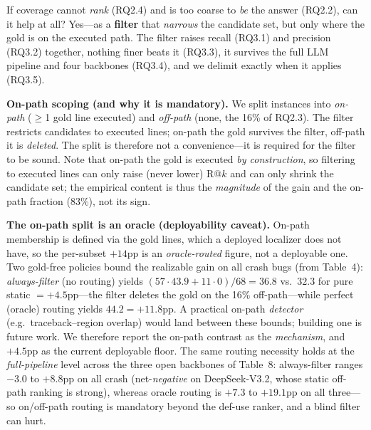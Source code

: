\documentclass[11pt]{article}
\begin{document}
If coverage cannot \emph{rank} (RQ2.4) and is too coarse to \emph{be} the answer (RQ2.2), can it help at all? Yes---as a \textbf{filter} that \emph{narrows} the candidate set, but only where the gold is on the executed path. The filter raises recall (RQ3.1) and precision (RQ3.2) together, nothing finer beats it (RQ3.3), it survives the full LLM pipeline and four backbones (RQ3.4), and we delimit exactly when it applies (RQ3.5).

\smallskip\noindent\textbf{On-path scoping (and why it is mandatory).} We split instances into \emph{on-path} ($\ge$1 gold line executed) and \emph{off-path} (none, the 16\% of RQ2.3). The filter restricts candidates to executed lines; on-path the gold survives the filter, off-path it is \emph{deleted}. The split is therefore not a convenience---it is required for the filter to be sound. Note that on-path the gold is executed \emph{by construction}, so filtering to executed lines can only raise (never lower) R@$k$ and can only shrink the candidate set; the empirical content is thus the \emph{magnitude} of the gain and the on-path fraction (83\%), not its sign.

\smallskip\noindent\textbf{The on-path split is an oracle (deployability caveat).} On-path membership is defined via the gold lines, which a deployed localizer does not have, so the per-subset $+14$pp is an \emph{oracle-routed} figure, not a deployable one. Two gold-free policies bound the realizable gain on all crash bugs (from Table~4): \emph{always-filter} (no routing) yields $(57{\cdot}43.9+11{\cdot}0)/68=36.8$ vs.\ $32.3$ for pure static $={+}4.5$pp---the filter deletes the gold on the 16\% off-path---while perfect (oracle) routing yields $44.2={+}11.8$pp. A practical on-path \emph{detector} (e.g.\ traceback--region overlap) would land between these bounds; building one is future work. We therefore report the on-path contrast as the \emph{mechanism}, and $+4.5$pp as the current deployable floor. The same routing necessity holds at the \emph{full-pipeline} level across the three open backbones of Table~8: always-filter ranges $-3.0$ to $+8.8$pp on all crash (net-\emph{negative} on DeepSeek-V3.2, whose static off-path ranking is strong), whereas oracle routing is $+7.3$ to $+19.1$pp on all three---so on/off-path routing is mandatory beyond the def-use ranker, and a blind filter can hurt.
\end{document}
